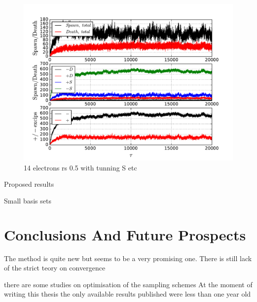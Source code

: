 \documentclass[twoside,english]{uiofysmaster}
\begin{document}
\begin{landscape}
	
	\begin{figure}[ht!]
		\centering
		\includegraphics[width=0.8\linewidth]{platFindStune}
		\caption{14 electrons rs 0.5 with tunning S etc }
		\label{fig:platFindStune}
	\end{figure}
	
\end{landscape}






Proposed results

Small basis sets



\section{Conclusions And Future Prospects}

The method is quite new but seems to be a very promising one. There is still lack of the strict teory on convergence 

there are some studies on optimisation of the sampling schemes
At the moment of writing this thesis the only available results published were less than one year old


\appendix
\renewcommand{\thesection}{\Alph{section}.\arabic{section}}
\setcounter{section}{0}
\end{document}
